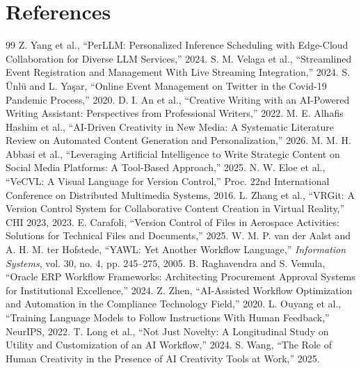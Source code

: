 \documentclass[conference]{IEEEtran}
\begin{document}
\section{References}
\begin{thebibliography}{99}
 Z. Yang et al., ``PerLLM: Personalized Inference Scheduling with Edge-Cloud Collaboration for Diverse LLM Services,'' 2024.
 S. M. Velaga et al., ``Streamlined Event Registration and Management With Live Streaming Integration,'' 2024.
 S. Ünlü and L. Yaşar, ``Online Event Management on Twitter in the Covid-19 Pandemic Process,'' 2020.
 D. I. An et al., ``Creative Writing with an AI-Powered Writing Assistant: Perspectives from Professional Writers,'' 2022.
 M. E. Alhafis Hashim et al., ``AI-Driven Creativity in New Media: A Systematic Literature Review on Automated Content Generation and Personalization,'' 2026.
 M. M. H. Abbasi et al., ``Leveraging Artificial Intelligence to Write Strategic Content on Social Media Platforms: A Tool-Based Approach,'' 2025.
 N. W. Eloe et al., ``VeCVL: A Visual Language for Version Control,'' Proc. 22nd International Conference on Distributed Multimedia Systems, 2016.
 L. Zhang et al., ``VRGit: A Version Control System for Collaborative Content Creation in Virtual Reality,'' CHI 2023, 2023.
 E. Carafoli, ``Version Control of Files in Aerospace Activities: Solutions for Technical Files and Documents,'' 2025.
 W. M. P. van der Aalst and A. H. M. ter Hofstede, ``YAWL: Yet Another Workflow Language,'' \emph{Information Systems}, vol. 30, no. 4, pp. 245--275, 2005.
 B. Raghavendra and S. Vemula, ``Oracle ERP Workflow Frameworks: Architecting Procurement Approval Systems for Institutional Excellence,'' 2024.
 Z. Zhen, ``AI-Assisted Workflow Optimization and Automation in the Compliance Technology Field,'' 2020.
 L. Ouyang et al., ``Training Language Models to Follow Instructions With Human Feedback,'' NeurIPS, 2022.
 T. Long et al., ``Not Just Novelty: A Longitudinal Study on Utility and Customization of an AI Workflow,'' 2024.
 S. Wang, ``The Role of Human Creativity in the Presence of AI Creativity Tools at Work,'' 2025.
\end{thebibliography}
\end{document}
